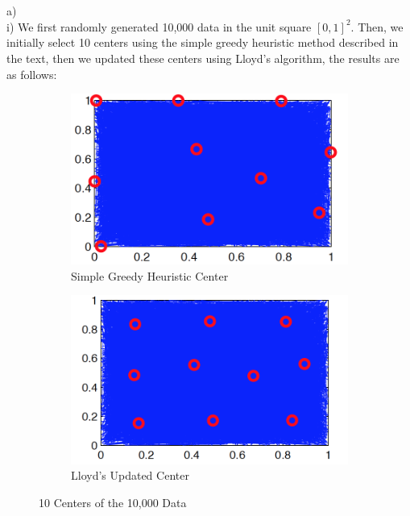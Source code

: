 \documentclass[12pt]{article}
\begin{document}
\newpage
{} \\\\
a)\\
\indent i) We first randomly generated 10,000 data in the unit square $\left[ 0, 1\right]^2$. Then, we initially select 10 centers using the simple greedy heuristic method described in the text, then we updated these centers using Lloyd's algorithm, the results are as follows:
\begin{figure}[H]
\centering
\begin{subfigure}{.5\textwidth}
  \centering
   \includegraphics[scale = 0.5]{8.jpg}
  \caption{Simple Greedy Heuristic Center}
  \label{fig:8}
\end{subfigure}%
\begin{subfigure}{.5\textwidth}
  \centering
   \includegraphics[scale = 0.5]{9.jpg}
  \caption{Lloyd's Updated Center}
  \label{fig:9}
\end{subfigure}
\caption{10 Centers of the 10,000 Data}
\label{fig:test}
\end{figure}
\end{document}
